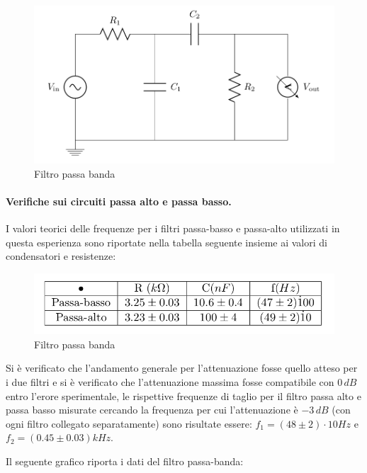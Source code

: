 \documentclass[10pt,a4paper]{article}
\begin{document}
\begin{figure}[h]
\centering
\includegraphics[scale=0.4]{passabanda.png}
\caption{Filtro passa banda}
\end{figure}

\paragraph{Verifiche sui circuiti passa alto e passa basso.}
I valori teorici delle frequenze per i filtri passa-basso e passa-alto utilizzati in questa esperienza sono riportate nella tabella seguente insieme ai valori di condensatori e resistenze:

\begin{figure}[h]
\centering
\includegraphics[scale=0.4]{tabella2.png}
\caption{Filtro passa banda}
\end{figure}

Si è verificato che l'andamento generale per l'attenuazione fosse quello atteso per i due filtri e si è verificato che l'attenuazione massima fosse compatibile con $0\,dB$ entro l'erore sperimentale, le rispettive frequenze di taglio per il filtro passa alto e passa basso misurate cercando la frequenza per cui l'attenuazione è $-3\,dB$ (con ogni filtro collegato separatamente) sono risultate essere: $f_1 = (48 \pm 2) \cdot 10 Hz$ e $f_2 = (0.45 \pm 0.03) kHz$.

Il seguente grafico riporta i dati del filtro passa-banda:
\end{document}
